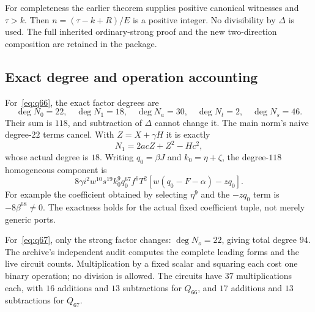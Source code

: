 \documentclass[11pt,letterpaper]{article}
\theoremstyle{definition}\newtheorem{definition}[theorem]{Definition}
\theoremstyle{remark}\newtheorem{remark}[theorem]{Remark}
\begin{document}
For completeness the earlier theorem supplies positive canonical witnesses and $\tau>k$. Then $n=(\tau-k+R)/E$ is a positive integer. No divisibility by $\Delta$ is used. The full inherited ordinary-strong proof and the new two-direction composition are retained in the package.

\subsection{Exact degree and operation accounting}
For~\eqref{eq:q66}, the exact factor degrees are
\[
\deg N_0=22,\quad\deg N_1=18,\quad\deg N_a=30,
\quad\deg N_t=2,\quad\deg N_s=46.
\]
Their sum is $118$, and subtraction of $\Delta$ cannot change it. The main norm's naive degree-$22$ terms cancel. With $Z=X+\gamma H$ it is exactly
\[
N_1=2acZ+Z^2-Hc^2,
\]
whose actual degree is $18$. Writing $q_0=\beta J$ and $k_0=\eta+\zeta$, the degree-$118$ homogeneous component is
\begin{equation}\label{eq:q66-leading}
8\gamma i^2w^{10}s^{19}k_0^9q_0^{67}f^6T^2
\left[w(q_0-F-\alpha)-zq_0\right].
\end{equation}
For example the coefficient obtained by selecting $\eta^9$ and the $-zq_0$ term is $-8\beta^{68}\ne0$. The exactness holds for the actual fixed coefficient tuple, not merely generic ports.

For~\eqref{eq:q67}, only the strong factor changes: $\deg N_o=22$, giving total degree $94$. The archive's independent audit computes the complete leading forms and the live circuit counts. Multiplication by a fixed scalar and squaring each cost one binary operation; no division is allowed. The circuits have $37$ multiplications each, with $16$ additions and $13$ subtractions for $Q_{66}$, and $17$ additions and $13$ subtractions for $Q_{67}$.
\end{document}
